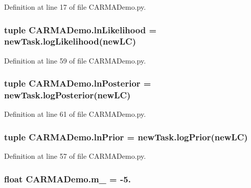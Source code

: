Definition at line 17 of file C\-A\-R\-M\-A\-Demo.\-py.

\hypertarget{namespace_c_a_r_m_a_demo_adb10228a4680a9d3c21526a3b3255882}{
\subsubsection[{ln\-Likelihood}]{\setlength{\rightskip}{0pt plus 5cm}tuple C\-A\-R\-M\-A\-Demo.\-ln\-Likelihood = new\-Task.\-log\-Likelihood({\bf new\-L\-C})}}\label{namespace_c_a_r_m_a_demo_adb10228a4680a9d3c21526a3b3255882}


Definition at line 59 of file C\-A\-R\-M\-A\-Demo.\-py.

\hypertarget{namespace_c_a_r_m_a_demo_aac99121f005f33a0a43e2daf6480c639}{
\subsubsection[{ln\-Posterior}]{\setlength{\rightskip}{0pt plus 5cm}tuple C\-A\-R\-M\-A\-Demo.\-ln\-Posterior = new\-Task.\-log\-Posterior({\bf new\-L\-C})}}\label{namespace_c_a_r_m_a_demo_aac99121f005f33a0a43e2daf6480c639}


Definition at line 61 of file C\-A\-R\-M\-A\-Demo.\-py.

\hypertarget{namespace_c_a_r_m_a_demo_a4f81958bf384b1670f402eea57d64ebb}{
\subsubsection[{ln\-Prior}]{\setlength{\rightskip}{0pt plus 5cm}tuple C\-A\-R\-M\-A\-Demo.\-ln\-Prior = new\-Task.\-log\-Prior({\bf new\-L\-C})}}\label{namespace_c_a_r_m_a_demo_a4f81958bf384b1670f402eea57d64ebb}


Definition at line 57 of file C\-A\-R\-M\-A\-Demo.\-py.

\hypertarget{namespace_c_a_r_m_a_demo_abc098662555c536fb138b929ca6217fe}{
\subsubsection[{m\-\_\-1}]{\setlength{\rightskip}{0pt plus 5cm}float C\-A\-R\-M\-A\-Demo.\-m\-\_ = -\/5.}}\label{namespace_c_a_r_m_a_demo_abc098662555c536fb138b929ca6217fe}



